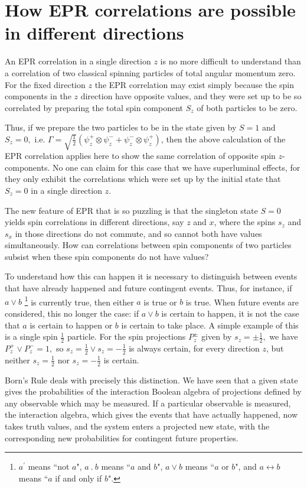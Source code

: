 \documentclass{article}
\begin{document}
\section*{How EPR correlations are possible in different directions}
An EPR correlation in a single direction $z$ is no more difficult to understand than a correlation of two classical spinning particles of total angular momentum zero. For the fixed direction $z$ the EPR correlation may exist simply because the spin components in the $z$ direction have opposite values, and they were set up to be so correlated by preparing the total spin component $S_z$ of both particles to be zero. 

Thus, if we prepare the two particles to be in the state given by $S =1$ and $ S_z = 0,$ i.e. $\Gamma = \sqrt{\frac{1}{2}}(\psi_z^+\otimes \psi_z^- + \psi_z^-\otimes \psi_z^+)$, then the above calculation of the EPR correlation applies here to show the same correlation of opposite spin $z$-components. No one can claim for this case that we have superluminal effects, for they only exhibit the correlations which were set up by the initial state that $S_z = 0$ in a single direction $z$.

The new feature of EPR that is so puzzling is that the singleton state $S = 0$ yields spin correlations in different directions, say $z$ and $x$, where the spins $s_z$ and $s_x$ in those directions do not commute, and so cannot both have values simultaneously. How can correlations between spin components of two particles subsist when these spin components do not have values?

To understand how this can happen it is necessary to distinguish between events that have already happened and future contingent events. Thus, for instance, if $a \vee b$  \footnote{$a^\prime$ means ``not $a$", $a\ .\ b$ means ``$a$ and $b$", $a \vee b$ means ``$a$ or $b$", and $a\leftrightarrow b$ means ``$a$ if and only if $b$".} is currently true, then either $a$ is true or $b$ is true. When future events are considered, this no longer the case: if $a \vee b$ is certain to happen, it is not the case that $a$ is certain to happen or $b$ is certain to take place. A simple example of this is a single spin $\frac{1}{2}$ particle. For the spin projections $P_z^\pm$ given by $s_z= \pm\frac{1}{2},$ we have $P_z^+\vee P_z^- = 1,$ so $s_z = \frac{1}{2} \vee s_z = -\frac{1}{2}$ is always certain, for every direction $z$, but neither $s_z = \frac{1}{2}$ nor $s_z = -\frac{1}{2}$ is certain.

Born's Rule deals with precisely this distinction. We have seen that a given state gives the probabilities of the interaction Boolean algebra of projections defined by any observable which may be measured. If a particular observable is measured, the interaction algebra, which gives the events that have actually happened, now takes truth values, and the system enters a projected new state, with the corresponding new probabilities for contingent future properties. 
\end{document}
